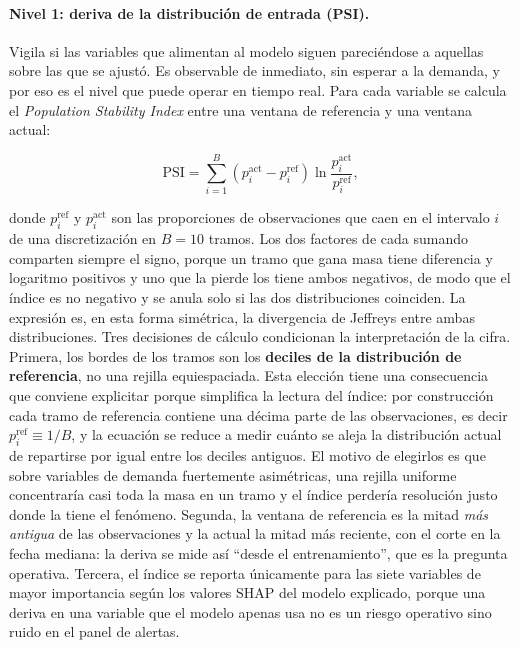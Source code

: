 \paragraph{Nivel 1: deriva de la distribución de entrada (PSI).} Vigila si las variables que alimentan al modelo siguen pareciéndose a aquellas sobre las que se ajustó. Es observable de inmediato, sin esperar a la demanda, y por eso es el nivel que puede operar en tiempo real. Para cada variable se calcula el \textit{Population Stability Index} entre una ventana de referencia y una ventana actual:

\begin{equation}
    \text{PSI} = \sum_{i=1}^{B} \left(p^{\text{act}}_i - p^{\text{ref}}_i\right) \ln \frac{p^{\text{act}}_i}{p^{\text{ref}}_i},
\end{equation}

donde $p^{\text{ref}}_i$ y $p^{\text{act}}_i$ son las proporciones de observaciones que caen en el intervalo $i$ de una discretización en $B = 10$ tramos. Los dos factores de cada sumando comparten siempre el signo, porque un tramo que gana masa tiene diferencia y logaritmo positivos y uno que la pierde los tiene ambos negativos, de modo que el índice es no negativo y se anula solo si las dos distribuciones coinciden. La expresión es, en esta forma simétrica, la divergencia de Jeffreys entre ambas distribuciones. Tres decisiones de cálculo condicionan la interpretación de la cifra. Primera, los bordes de los tramos son los \textbf{deciles de la distribución de referencia}, no una rejilla equiespaciada. Esta elección tiene una consecuencia que conviene explicitar porque simplifica la lectura del índice: por construcción cada tramo de referencia contiene una décima parte de las observaciones, es decir $p^{\text{ref}}_i \equiv 1/B$, y la ecuación se reduce a medir cuánto se aleja la distribución actual de repartirse por igual entre los deciles antiguos. El motivo de elegirlos es que sobre variables de demanda fuertemente asimétricas, una rejilla uniforme concentraría casi toda la masa en un tramo y el índice perdería resolución justo donde la tiene el fenómeno. Segunda, la ventana de referencia es la mitad \emph{más antigua} de las observaciones y la actual la mitad más reciente, con el corte en la fecha mediana: la deriva se mide así ``desde el entrenamiento'', que es la pregunta operativa. Tercera, el índice se reporta únicamente para las siete variables de mayor importancia según los valores SHAP del modelo explicado, porque una deriva en una variable que el modelo apenas usa no es un riesgo operativo sino ruido en el panel de alertas.

